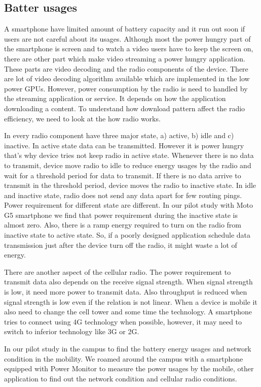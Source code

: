 \subsection{Batter usages}
A smartphone have limited amount of battery capacity and it run out soon if users are not careful about its usages. Although most the power hungry part of the smartphone is screen and to watch a video users have to keep the screen on, there are other part which make video streaming a power hungry application. These parts are video decoding and the radio components of the device. There are lot of video decoding algorithm available which are implemented in the low power GPUs. However, power consumption by the radio is need to handled by the streaming application or service. It depends on how the application downloading a content. To understand how download pattern affect the radio efficiency, we need to look at the how radio works. 

In every radio component have three major state, a) active, b) idle and c) inactive. In active state data can be transmitted. However it is power hungry that's why device tries not keep radio in active state. Whenever there is no data to transmit, device move radio to idle to reduce energy usages by the radio and wait for a threshold period for data to transmit. If there is no data arrive to transmit in the threshold period, device moves the radio to inactive state. In idle and inactive state, radio does not send any data apart for few routing pings. Power requirement for different state are different. In our pilot study with Moto G5 smartphone we find that power requirement during the inactive state is almost zero. Also, there is a ramp energy required to turn on the radio from inactive state to active state. So, if a poorly designed application schedule data transmission just after the device turn off the radio, it might waste a lot of energy.

There are another aspect of the cellular radio. The power requirement to transmit data also depends on the receive signal strength. When signal strength is low, it need more power to transmit data. Also throughput is reduced when signal strength is low even if the relation is not linear. When a device is mobile it also need to change the cell tower and some time the technology. A smartphone tries to connect using 4G technology when possible, however, it may need to switch to inferior technology like 3G or 2G.

In our pilot study in the campus to find the battery energy usages and network condition in the mobility. We roamed around the campus with a smartphone equipped with Power Monitor to measure the power usages by the mobile, other application to find out the network condition and cellular radio conditions.

